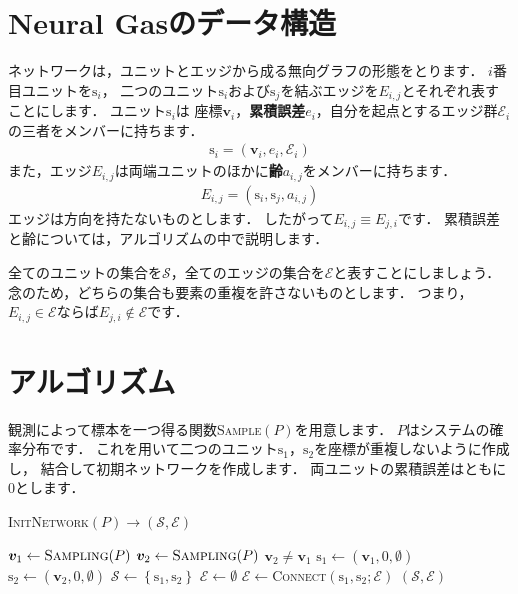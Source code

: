﻿\documentclass{jsarticle}
\begin{document}
\section{Neural Gasのデータ構造}

ネットワークは，ユニットとエッジから成る無向グラフの形態をとります．
$i$番目ユニットを$\mathrm{s}_{i}$，
二つのユニット$\mathrm{s}_{i}$および$\mathrm{s}_{j}$を結ぶエッジを$E_{i,j}$とそれぞれ表すことにします．
ユニット$\mathrm{s}_{i}$は
座標$\bm{v}_{i}$，\textbf{累積誤差}$e_{i}$，自分を起点とするエッジ群$\mathcal{E}_{i}$の三者をメンバーに持ちます．
\begin{align*}
\mathrm{s}_{i}=\left(\bm{v}_{i}, e_{i}, \mathcal{E}_{i}\right)
\end{align*}
また，エッジ$E_{i,j}$は両端ユニットのほかに\textbf{齢}$a_{i,j}$をメンバーに持ちます．
\begin{align*}
E_{i,j}=\left(\mathrm{s}_{i}, \mathrm{s}_{j}, a_{i,j}\right)
\end{align*}
エッジは方向を持たないものとします．
したがって$E_{i,j}\equiv E_{j,i}$です．
累積誤差と齢については，アルゴリズムの中で説明します．

全てのユニットの集合を$\mathcal{S}$，全てのエッジの集合を$\mathcal{E}$と表すことにしましょう．
念のため，どちらの集合も要素の重複を許さないものとします．
つまり，$E_{i,j}\in\mathcal{E}$ならば$E_{j,i}\notin\mathcal{E}$です．



\section{アルゴリズム}

観測によって標本を一つ得る関数\textsc{Sample}$(P)$を用意します．
$P$はシステムの確率分布です．
これを用いて二つのユニット$\mathrm{s}_{1}$，$\mathrm{s}_{2}$を座標が重複しないように作成し，
結合して初期ネットワークを作成します．
両ユニットの累積誤差はともに0とします．

\begin{algorithm}[tbh]
\caption{\textsc{InitNetwork}$(P)\rightarrow(\mathcal{S},\mathcal{E})$}
\begin{algorithmic}[1]
\State $\bm{v}_{1}\leftarrow\mbox{\textsc{Sampling}}(P)$
\Repeat
  \State $\bm{v}_{2}\leftarrow\mbox{\textsc{Sampling}}(P)$
\Until $\bm{v}_{2}\neq\bm{v}_{1}$
\State $\mathrm{s}_{1}\leftarrow\left(\bm{v}_{1},0,\emptyset\right)$
\State $\mathrm{s}_{2}\leftarrow\left(\bm{v}_{2},0,\emptyset\right)$
\State $\mathcal{S}\leftarrow\left\{\mathrm{s}_{1}, \mathrm{s}_{2}\right\}$
\State $\mathcal{E}\leftarrow\emptyset$
\State $\mathcal{E}\leftarrow$\textsc{Connect}$\left(\mathrm{s}_{1}, \mathrm{s}_{2};\mathcal{E}\right)$
 $(\mathcal{S}, \mathcal{E})$
\end{algorithmic}
\end{algorithm}
\end{document}
